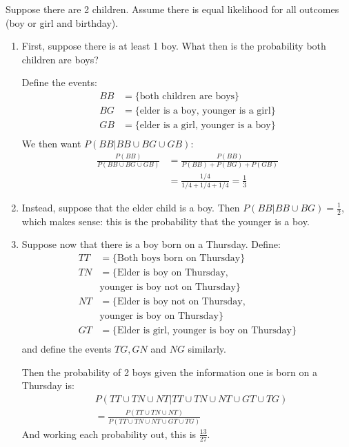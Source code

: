 \documentclass[../Main.tex]{subfiles}
\begin{document}
\begin{example}
        Suppose there are 2 children. Assume there is equal likelihood for all outcomes (boy or girl and birthday).
        \begin{enumerate}
        \item First, suppose there is at least 1 boy. What then is the probability both children are boys?\par
        Define the events:
        \begin{align*}
            BB &= \{\text{both children are boys}\} \\
            BG &= \{\text{elder is a boy, younger is a girl}\} \\
            GB &= \{\text{elder is a girl, younger is a boy}\} \\
        \end{align*}
        We then want $P(BB | BB \cup BG \cup GB)$:
        \begin{align*}
            \frac{P(BB)}{P(BB \cup BG \cup GB)} &= \frac{P(BB)}{P(BB) + P(BG) + P(GB)} \\
            &= \frac{1/4}{1/4 + 1/4 + 1/4} = \frac{1}{3}
        \end{align*}
        \item Instead, suppose that the elder child is a boy.
        Then $P(BB | BB \cup BG) = \frac{1}{2}$, which makes sense: this is the probability that the younger is a boy.
        \item Suppose now that there is a boy born on a Thursday. Define:
            \begin{align*}
                TT &= \{\text{Both boys born on Thursday}\} \\
                TN &= \{\text{Elder is boy on Thursday,}\\
                &\text{younger is boy not on Thursday}\} \\
                NT &= \{\text{Elder is boy not on Thursday,}\\
                &\text{younger is boy on Thursday}\} \\
                GT &= \{\text{Elder is girl, younger is boy on Thursday}\} \\
            \end{align*}
            and define the events $TG, GN$ and $NG$ similarly.\par
            Then the probability of 2 boys given the information one is born on a Thursday is:
            \begin{align*}
                &P(TT \cup TN \cup NT | TT \cup TN \cup NT \cup GT \cup TG) \\
                &= \frac{P(TT \cup TN \cup NT)}{P(TT \cup TN \cup NT \cup GT \cup TG)}
            \end{align*}
            And working each probability out, this is $\frac{13}{27}$.
    \end{enumerate}
\end{example}
\end{document}
